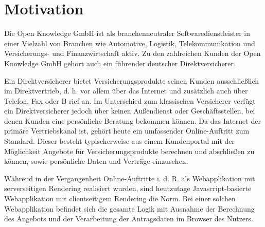 \vspace{-\baselineskip}

\section{Motivation}

Die Open Knowledge GmbH ist als branchenneutraler Softwaredienstleister in einer Vielzahl von Branchen wie Automotive, Logistik, Telekommunikation und Versicherungs- und Finanzwirtschaft aktiv. Zu den zahlreichen Kunden der Open Knowledge GmbH gehört auch ein führender deutscher Direktversicherer. 

Ein Direktversicherer bietet Versicherungsprodukte seinen Kunden ausschließlich im Direktvertrieb, d. h. vor allem über das Internet und zusätzlich auch über Telefon, Fax oder B
rief an. Im Unterschied zum klassischen Versicherer verfügt ein Direktversicherer jedoch über keinen Außendienst oder Geschäftsstellen, bei denen Kunden eine persönliche Beratung bekommen können. Da das Internet der primäre Vertriebskanal ist, gehört heute ein umfassender Online-Auftritt zum Standard. Dieser besteht typischerweise aus einem Kundenportal mit der Möglichkeit Angebote für Versicherungsprodukte berechnen und abschließen zu können, sowie persönliche Daten und Verträge einzusehen.


Während in der Vergangenheit Online-Auftritte i. d. R. als Webapplikation mit serverseitigen Rendering realisiert wurden, sind heutzutage Javascript-basierte Webapplikation mit clientseitigem Rendering die Norm. Bei einer solchen Webapplikation befindet sich die gesamte Logik mit Ausnahme der Berechnung des Angebots und der Verarbeitung der Antragsdaten im Browser des Nutzers.

